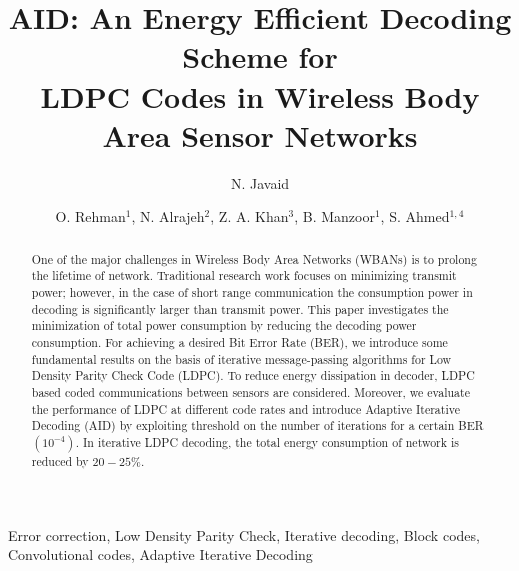 \documentclass[3p,times,procedia]{elsarticle}
\begin{document}
\begin{frontmatter}

\author{N. Javaid}


\title{AID: An Energy Efficient Decoding Scheme for\\ LDPC Codes in Wireless Body Area Sensor Networks}

\author{O. Rehman$^{1}$, N. Alrajeh$^{2}$, Z. A. Khan$^{3}$, B. Manzoor$^{1}$, S. Ahmed$^{1, 4}$}

\address{$^{1}$COMSATS Institute of Information Technology, Islamabad, Pakistan. \\
        $^{2}$B.M.T., C.A.M.S., King Saud University, Riyadh, Saudi Arabia.\\
        $^{3}$Faculty of Engineering, Dalhousie University, Halifax, Canada.\\
        $^{4}$Abasyn University Peshawar, Pakistan.\\
}

\begin{abstract}
One of the major challenges in Wireless Body Area Networks (WBANs) is to prolong the lifetime of network. Traditional research work focuses on minimizing transmit power; however, in the case of short range communication the consumption power in decoding is significantly larger than transmit power. This paper investigates the minimization of total power consumption by reducing the decoding power consumption. For achieving a desired Bit Error Rate (BER), we introduce some fundamental results on the basis of iterative message-passing algorithms for Low Density Parity Check Code (LDPC). To reduce energy dissipation in decoder, LDPC based coded communications between sensors are considered. Moreover, we evaluate the performance of LDPC at different code rates and introduce Adaptive Iterative Decoding (AID) by exploiting threshold on the number of iterations for a certain BER $(10^{-4})$. In iterative LDPC decoding, the total energy consumption of network is reduced by $20-25 \%$.
\end{abstract}

\begin{keyword}
Error correction, Low Density Parity Check, Iterative decoding, Block codes, Convolutional codes, Adaptive Iterative Decoding
\end{keyword}

\end{frontmatter}
\end{document}
